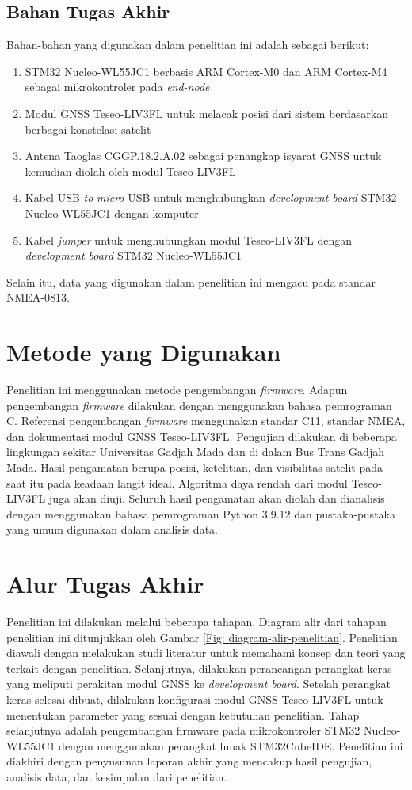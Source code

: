\subsection{Bahan Tugas Akhir}
Bahan-bahan yang digunakan dalam penelitian ini adalah sebagai berikut:
\begin{enumerate}
	\item STM32 Nucleo-WL55JC1 berbasis ARM Cortex-M0 dan ARM Cortex-M4 sebagai mikrokontroler pada \textit{end-node}
	\item Modul GNSS Teseo-LIV3FL untuk melacak posisi dari sistem berdasarkan berbagai konstelasi satelit
	\item Antena Taoglas CGGP.18.2.A.02 sebagai penangkap isyarat GNSS untuk kemudian diolah oleh modul Teseo-LIV3FL
	\item Kabel USB \textit{to} \textit{micro} USB untuk menghubungkan \textit{development board} STM32 Nucleo-WL55JC1 dengan komputer
	\item Kabel \textit{jumper} untuk menghubungkan modul Teseo-LIV3FL dengan \textit{development board} STM32 Nucleo-WL55JC1
\end{enumerate}
Selain itu, data yang digunakan dalam penelitian ini mengacu pada standar NMEA-0813.

\section{Metode yang Digunakan}
Penelitian ini menggunakan metode pengembangan \textit{firmware}. Adapun pengembangan \textit{firmware} dilakukan dengan menggunakan bahasa pemrograman C. Referensi pengembangan \textit{firmware} menggunakan standar C11, standar NMEA, dan dokumentasi modul GNSS Teseo-LIV3FL. Pengujian dilakukan di beberapa lingkungan sekitar Universitas Gadjah Mada dan di dalam Bus Trans Gadjah Mada. Hasil pengamatan berupa posisi, ketelitian, dan visibilitas satelit pada saat itu pada keadaan langit ideal. Algoritma daya rendah dari modul Teseo-LIV3FL juga akan diuji. Seluruh hasil pengamatan akan diolah dan dianalisis dengan menggunakan bahasa pemrograman Python 3.9.12 dan pustaka-pustaka yang umum digunakan dalam analisis data.

\section{Alur Tugas Akhir}
Penelitian ini dilakukan melalui beberapa tahapan. Diagram alir dari tahapan penelitian ini ditunjukkan oleh Gambar \ref{Fig: diagram-alir-penelitian}. Penelitian diawali dengan melakukan studi literatur untuk memahami konsep dan teori yang terkait dengan penelitian. Selanjutnya, dilakukan perancangan perangkat keras yang meliputi perakitan modul GNSS ke \textit{development board}. Setelah perangkat keras selesai dibuat, dilakukan konfigurasi modul GNSS Teseo-LIV3FL untuk menentukan parameter yang sesuai dengan kebutuhan penelitian. Tahap selanjutnya adalah pengembangan firmware pada mikrokontroler STM32 Nucleo-WL55JC1 dengan menggunakan perangkat lunak STM32CubeIDE. Penelitian ini diakhiri dengan penyusunan laporan akhir yang mencakup hasil pengujian, analisis data, dan kesimpulan dari penelitian.

